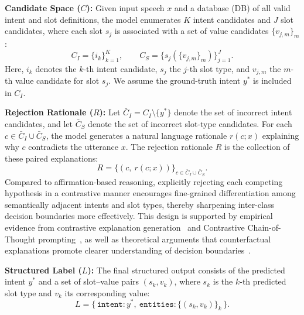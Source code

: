 \documentclass[cameraready]{Interspeech}
\begin{document}
\textbf{Candidate Space ($C$):}
Given input speech $x$ and a database (DB) of all valid intent and slot definitions, the model enumerates $K$ intent candidates
and $J$ slot candidates, where each slot $s_j$ is associated with
a set of value candidates $\{v_{j,m}\}_m$:
\begin{equation}
C_I = \{i_k\}_{k=1}^{K}, \qquad
C_S = \{ s_j(\{v_{j,m}\}_m) \}_{j=1}^{J}.
\end{equation}
Here, $i_k$ denotes the $k$-th intent candidate, $s_j$ the $j$-th
slot type, and $v_{j,m}$ the $m$-th value candidate for slot $s_j$.
We assume the ground-truth intent $y^*$ is included in $C_I$.

\textbf{Rejection Rationale ($R$):}
Let $\bar{C}_I = C_I \setminus \{y^*\}$ denote the set of incorrect
intent candidates, and let $\bar{C}_S$ denote the set of incorrect
slot-type candidates. For each $c \in \bar{C}_I \cup \bar{C}_S$,
the model generates a natural language rationale $r(c; x)$ explaining
why $c$ contradicts the utterance $x$. The rejection rationale $R$ is
the collection of these paired explanations:
\begin{equation}
R = \{(c,\ r(c; x))\}_{c \in \bar{C}_I \cup \bar{C}_S}.
\end{equation}
Compared to affirmation-based reasoning, explicitly rejecting each
competing hypothesis in a contrastive manner encourages
fine-grained differentiation among semantically adjacent intents
and slot types,
thereby sharpening inter-class decision boundaries more effectively.
This design is supported by empirical evidence from contrastive
explanation generation~\cite{chen-etal-2021-kace} and Contrastive
Chain-of-Thought prompting~\cite{shim2024chainofthoughtaugmentationlogitcontrast}, as well as
theoretical arguments that counterfactual explanations promote
clearer understanding of decision boundaries~\cite{verma2021counterfactual}.

\textbf{Structured Label ($L$):}
The final structured output consists of the predicted intent $y^*$
and a set of slot--value pairs $(s_k, v_k)$, where $s_k$ is the
$k$-th predicted slot type and $v_k$ its corresponding value:
\begin{equation}
L=\{\,\texttt{intent}: y^*,\ 
\texttt{entities}: \{(s_k, v_k)\}_k\,\}.
\end{equation}
\end{document}
